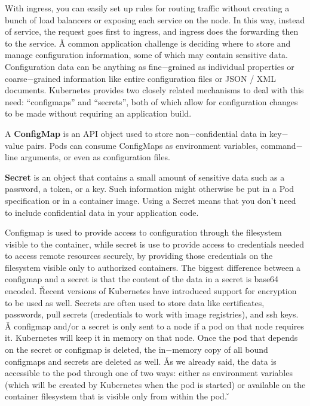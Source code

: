 With ingress, you can easily set up rules for routing traffic without creating a bunch of load balancers or exposing
each service on the node. In this way, instead of service, the request goes first to ingress, and ingress does the
forwarding then to the service. \v

A common application challenge is deciding where to store and manage configuration information, some of which may
contain sensitive data. Configuration data can be anything as fine$-$grained as individual properties or
coarse$-$grained information like entire configuration files or JSON / XML documents. Kubernetes provides two closely
related mechanisms to deal with this need: ``configmaps'' and ``secrets'', both of which allow for configuration
changes to be made without requiring an application build.

\bd[ConfigMap]
A \textbf{ConfigMap} is an API object used to store non$-$confidential data in key$-$value pairs. Pods can consume
ConfigMaps as environment variables, command$-$line arguments, or even as configuration files.
\ed

\bd[Secret]
\textbf{Secret} is an object that contains a small amount of sensitive data such as a password, a token, or a key. Such
information might otherwise be put in a Pod specification or in a container image. Using a Secret means that you don't
need to include confidential data in your application code.
\ed


Configmap is used to provide access to configuration through the filesystem visible to the container, while secret is
use to provide access to credentials needed to access remote resources securely, by providing those credentials on
the filesystem visible only to authorized containers. The biggest difference between a configmap and a secret is that
the content of the data in a secret is base64 encoded. \v

Recent versions of Kubernetes have introduced support for encryption
to be used as well. Secrets are often used to store data like certificates, passwords, pull secrets (credentials to work
with image registries), and ssh keys. \v

A configmap and/or a secret is only sent to a node if a pod on that node requires it. Kubernetes will keep it in
memory on that node. Once the pod that depends on the secret or configmap is deleted, the in$-$memory copy of all
bound configmaps and secrets are deleted as well. \v

As we already said, the data is accessible to the pod through one of two ways: either as environment variables (which
will be created by Kubernetes when the pod is started) or available on the container filesystem that is visible only
from within the pod. \v


